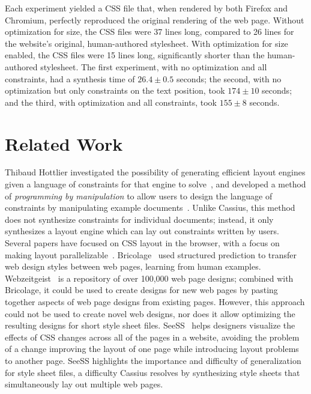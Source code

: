 \documentclass[10pt]{sigplanconf}
\newcommand{\name}{Cassius\xspace}
\begin{document}
Each experiment yielded a CSS file that,
  when rendered by both Firefox and Chromium,
  perfectly reproduced the original rendering of the web page.
Without optimization for size, the CSS files were 37 lines long,
  compared to 26 lines for the website's original, human-authored stylesheet.
With optimization for size enabled, the CSS files were 15 lines long,
  significantly shorter than the human-authored stylesheet.
The first experiment, with no optimization and all constraints,
  had a synthesis time of $26.4 \pm 0.5$ seconds;
  the second, with no optimization but only constraints on the text position,
  took $174 \pm 10$ seconds;
  and the third, with optimization and all constraints,
  took $155 \pm 8$ seconds.

\section{Related Work}

Thibaud Hottlier investigated the possibility
  of generating efficient layout engines
  given a language of constraints for that engine to solve~\cite{thibaud-thesis},
  and developed a method of \emph{programming by manipulation}
  to allow users to design the language of constraints
  by manipulating example documents~\cite{thibaud-uist}.
Unlike \name, this method does not synthesize constraints
  for individual documents;
  instead, it only synthesizes a layout engine
  which can lay out constraints written by users.
Several papers have focused on CSS layout in the browser,
  with a focus on making layout parallelizable~\cite{fast-parallel-layout,fast-browser}.
Bricolage~\cite{bricolage} used structured prediction
  to transfer web design styles between web pages,
  learning from human examples.
Webzeitgeist~\cite{webzeitgeist} is a repository
  of over 100,000 web page designs;
  combined with Bricolage,
  it could be used to create designs for new web pages
  by pasting together aspects of web page designs from existing pages.
However, this approach could not be used to create novel web designs,
  nor does it allow optimizing the resulting designs
  for short style sheet files.
SeeSS~\cite{seess} helps designers visualize the effects of CSS changes
  across all of the pages in a website,
  avoiding the problem of a change improving the layout of one page
  while introducing layout problems to another page.
SeeSS highlights the importance and difficulty of generalization
  for style sheet files, a difficulty \name resolves
  by synthesizing style sheets that simultaneously lay out
  multiple web pages.
\end{document}
